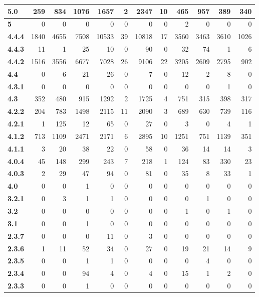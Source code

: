 \begin{table}[htbp]
{\begin{tabular}{|l|r|r|r|r|r|r|r|r|r|r|r|}
\textbf{5.0} & 259 & 834 & 1076 & 1657 & 2 & 2347 & 10 & 465 & 957 & 389 & 340 \\ \hline
\textbf{5} & 0 & 0 & 0 & 0 & 0 & 0 & 0 & 2 & 0 & 0 & 0 \\ \hline
\textbf{4.4.4} & 1840 & 4655 & 7508 & 10533 & 39 & 10818 & 17 & 3560 & 3463 & 3610 & 1026 \\ \hline
\textbf{4.4.3} & 11 & 1 & 25 & 10 & 0 & 90 & 0 & 32 & 74 & 1 & 6 \\ \hline
\textbf{4.4.2} & 1516 & 3556 & 6677 & 7028 & 26 & 9106 & 22 & 3205 & 2609 & 2795 & 902 \\ \hline
\textbf{4.4} & 0 & 6 & 21 & 26 & 0 & 7 & 0 & 12 & 2 & 8 & 0 \\ \hline
\textbf{4.3.1} & 0 & 0 & 0 & 0 & 0 & 0 & 0 & 0 & 0 & 1 & 0 \\ \hline
\textbf{4.3} & 352 & 480 & 915 & 1292 & 2 & 1725 & 4 & 751 & 315 & 398 & 317 \\ \hline
\textbf{4.2.2} & 204 & 783 & 1498 & 2115 & 11 & 2090 & 3 & 689 & 630 & 739 & 116 \\ \hline
\textbf{4.2.1} & 1 & 125 & 12 & 65 & 0 & 27 & 0 & 3 & 0 & 4 & 1 \\ \hline
\textbf{4.1.2} & 713 & 1109 & 2471 & 2171 & 6 & 2895 & 10 & 1251 & 751 & 1139 & 351 \\ \hline
\textbf{4.1.1} & 3 & 20 & 38 & 22 & 0 & 58 & 0 & 36 & 14 & 14 & 3 \\ \hline
\textbf{4.0.4} & 45 & 148 & 299 & 243 & 7 & 218 & 1 & 124 & 83 & 330 & 23 \\ \hline
\textbf{4.0.3} & 2 & 29 & 47 & 94 & 0 & 81 & 0 & 35 & 8 & 33 & 1 \\ \hline
\textbf{4.0} & 0 & 0 & 1 & 0 & 0 & 0 & 0 & 0 & 0 & 0 & 0 \\ \hline
\textbf{3.2.1} & 0 & 3 & 1 & 1 & 0 & 0 & 0 & 0 & 1 & 0 & 0 \\ \hline
\textbf{3.2} & 0 & 0 & 0 & 0 & 0 & 0 & 0 & 1 & 0 & 1 & 0 \\ \hline
\textbf{3.1} & 0 & 0 & 1 & 0 & 0 & 0 & 0 & 0 & 0 & 0 & 0 \\ \hline
\textbf{2.3.7} & 0 & 0 & 0 & 11 & 0 & 3 & 0 & 0 & 0 & 0 & 0 \\ \hline
\textbf{2.3.6} & 1 & 11 & 52 & 34 & 0 & 27 & 0 & 19 & 21 & 14 & 9 \\ \hline
\textbf{2.3.5} & 0 & 0 & 1 & 1 & 0 & 0 & 0 & 0 & 4 & 0 & 0 \\ \hline
\textbf{2.3.4} & 0 & 0 & 94 & 4 & 0 & 4 & 0 & 15 & 1 & 2 & 0 \\ \hline
\textbf{2.3.3} & 0 & 0 & 1 & 0 & 0 & 0 & 0 & 0 & 0 & 0 & 0 \\ \hline

\end{tabular}}
\end{table}
